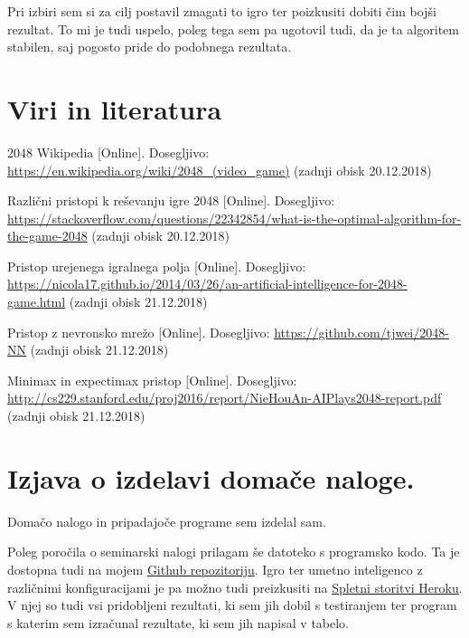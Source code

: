 \documentclass[a4paper,11pt]{article}
\begin{document}
Pri izbiri sem si za cilj postavil zmagati to igro ter poizkusiti dobiti čim bojši rezultat. To mi je tudi uspelo, poleg tega sem pa ugotovil tudi, da je ta algoritem stabilen, saj pogosto pride do podobnega rezultata.

\setcounter{secnumdepth}{0}
\section{Viri in literatura}
\begin{enumerate}[label={[\arabic*]}]
  \item \label{l1} 2048 Wikipedia [Online]. Dosegljivo: \url{https://en.wikipedia.org/wiki/2048_(video_game)} (zadnji obisk 20.12.2018)
  \item \label{l2} Različni pristopi k reševanju igre 2048 [Online]. Dosegljivo: \url{https://stackoverflow.com/questions/22342854/what-is-the-optimal-algorithm-for-the-game-2048} (zadnji obisk 20.12.2018)
  \item \label{l3} Pristop urejenega igralnega polja [Online]. Dosegljivo: \url{https://nicola17.github.io/2014/03/26/an-artificial-intelligence-for-2048-game.html} (zadnji obisk 21.12.2018)
  \item \label{l4} Pristop z nevronsko mrežo [Online]. Dosegljivo: \url{https://github.com/tjwei/2048-NN} (zadnji obisk 21.12.2018)
  \item \label{l5} Minimax in expectimax pristop [Online]. Dosegljivo: \url{http://cs229.stanford.edu/proj2016/report/NieHouAn-AIPlays2048-report.pdf} (zadnji obisk 21.12.2018)
\end{enumerate}

\section{Izjava o izdelavi domače naloge.}
Domačo nalogo in pripadajoče programe sem izdelal sam.

\appendix
\appendixpage
Poleg poročila o seminarski nalogi prilagam še datoteko s programsko kodo. Ta je dostopna tudi na mojem \href{https://github.com/smeznar/2048}{Github repozitoriju}. Igro ter umetno inteligenco z različnimi konfiguracijami je pa možno tudi preizkusiti na \href{https://smeznar-ai-2048.herokuapp.com/#}{Spletni storitvi Heroku}. V njej so tudi vsi pridobljeni rezultati, ki sem jih dobil s testiranjem ter program s katerim sem izračunal rezultate, ki sem jih napisal v tabelo.
\end{document}
